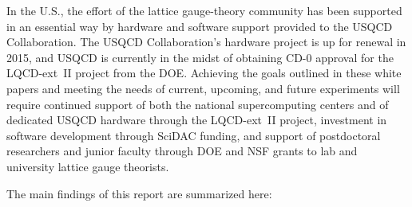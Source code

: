 In the U.S., the effort of the lattice gauge-theory community has been supported in an essential way by hardware and software support provided to the USQCD Collaboration.  The USQCD Collaboration's hardware project is up for renewal in 2015, and USQCD is currently in the midst of obtaining CD-0 approval for the LQCD-ext~II project from the DOE.  Achieving the goals outlined in these white papers and meeting the needs of current, upcoming, and future experiments will require continued support of both the national supercomputing centers and of dedicated USQCD hardware through the LQCD-ext~II project, investment in software development through SciDAC funding, and support of postdoctoral researchers and junior faculty through DOE and NSF grants to lab and university lattice gauge theorists.   

The main findings of this report are summarized here:

